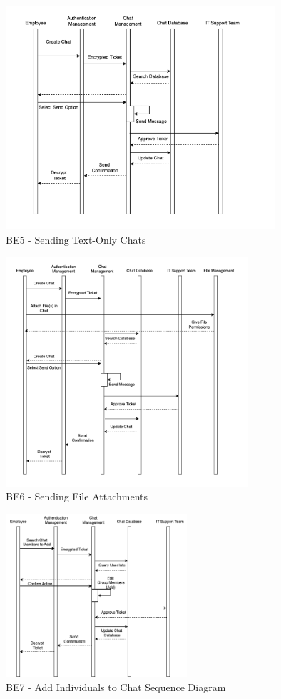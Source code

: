 \documentclass[]{article}
\begin{document}

\begin{figure}[H]
	\centering
	\includegraphics[width=10cm]{BE5.png}
	\caption{BE5 - Sending Text-Only Chats}
	\label{fig:galaxy}
\end{figure}
\hspace{1cm}


\begin{figure}[H]
	\centering
	\includegraphics[width=9cm]{BE6.png}
	\caption{BE6 - Sending File Attachments}
	\label{fig:galaxy}
\end{figure}

\begin{figure}[H]
	\centering
	\includegraphics[width=0.6\textwidth]{BE7.png}
	\caption{BE7 - Add Individuals to Chat Sequence Diagram}
\end{figure}
\end{document}
